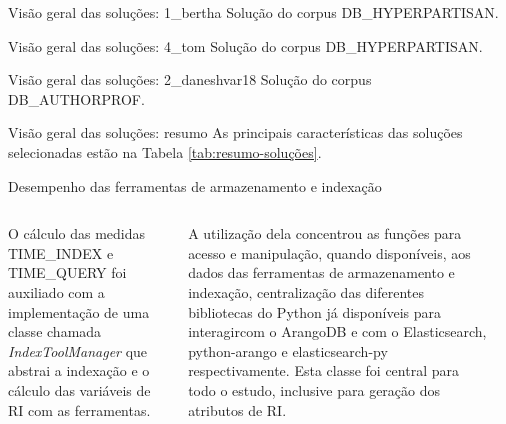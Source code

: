 \documentclass[%
  10pt,%
  aspectratio = 169,%
  compress,%
  t,%
]{beamer}%
\begin{document}
    \begin{frame}{}{Visão geral das soluções: 1\_bertha}
        Solução do corpus DB\_HYPERPARTISAN.
        
        

    \end{frame}

    \begin{frame}{}{Visão geral das soluções: 4\_tom}
        Solução do corpus DB\_HYPERPARTISAN.
        
        
        
    \end{frame}

    \begin{frame}{}{Visão geral das soluções: 2\_daneshvar18}
        Solução do corpus DB\_AUTHORPROF.
        
        
        
    \end{frame}

    \begin{frame}{}{Visão geral das soluções: resumo}
        As principais características das soluções selecionadas estão na Tabela \ref{tab:resumo-soluções}.
        
        

    \end{frame}

    \begin{frame}{}{Desempenho das ferramentas de armazenamento e indexação}
        \begin{columns}
            O cálculo das medidas TIME\_INDEX e TIME\_QUERY foi auxiliado com a implementação de uma classe chamada \textit{IndexToolManager} que abstrai a indexação e o cálculo das variáveis de RI com as ferramentas.
            
            A utilização dela concentrou as funções para acesso e manipulação, quando disponíveis, aos dados das ferramentas de armazenamento e indexação, centralização das diferentes bibliotecas do Python já disponíveis para interagircom o ArangoDB e com o Elasticsearch, python-arango e elasticsearch-py respectivamente.
            Esta classe foi central para todo o estudo, inclusive para geração dos atributos de RI.

                \vspace{-1.0cm}
                \inputminted[bgcolor=bg, fontsize=\scriptsize,
                baselinestretch=1, tabsize=2, breaklines]{python}{codes/indextoolmanager-reduced.py}
        \end{columns}
    \end{frame}
    
\end{document}
